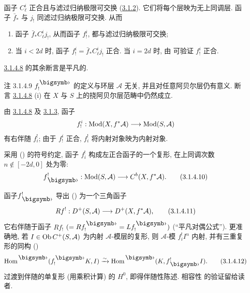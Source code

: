 函子 $C^{i}_{\ell}$ 正合且与滤过归纳极限可交换 (\hyperref[XVIII.subsubsec3.1.2]{3.1.2}). 它们将每个层映为无上同调层. 函子 $\bar{f}_{\ast}$ 与 $j_{!}$ 同滤过归纳极限可交换. 从而
\begin{enumerate}
\renewcommand{\theenumi}{\alph{enumi}}
\renewcommand{\labelenumi}{\theenumi)}
\item 函子 $\bar{f}_{\ast}C^{i}_{\ell}j_{!}$, 从而函子 $f^{i}_{!}$, 都与滤过归纳极限可交换;

\item 当 $i<2d$ 时, 函子 $f^{i}_{!}=\bar{f}_{\ast}C^{i}_{\ell}j_{!}$ 正合. 当 $i=2d$ 时, 由  可验证 $f^{i}_{!}$ 正合.
\end{enumerate}

\hyperref[XVIII.lem3.1.4.8]{3.1.4.8} 的其余断言是平凡的.

\hypertarget{sga4.exp.XVIII.remark.3.1.4.9}{}\begin{enonce*}[remark]{注 3.1.4.9}
$f^{\bigdot}_{!}$ 的定义与环层 $\mathcal{A}$ 无关, 并且对任意阿贝尔层仍有意义. 断言 \hyperref[XVIII.lem3.1.4.8]{3.1.4.8} (i) 在 $X$ 与 $S$ 上的挠阿贝尔层范畴中仍然成立.
\end{enonce*}

由 \hyperref[XVIII.lem3.1.4.8]{3.1.4.8} 及 \hyperref[XVIII.lem3.1.3]{3.1.3}, 函子
$$
f^{i}_{!}:\operatorname{Mod}(X,f^{\ast}\mathcal{A})\longrightarrow
\operatorname{Mod}(S,\mathcal{A})
$$
有右伴随 $f^{!}_{i}$; 由于 $f^{i}_{!}$ 正合, $f^{!}_{i}$ 将内射对象映为内射对象.

采用 () 的符号约定, 函子 $f^{!}_{i}$ 构成左正合函子的一个复形, 在上同调次数 $n\not\in [-2d,0]$ 处为零:
\begin{equation*}
f^{!}_{\bigdot}:\Mod(S,\mathcal{A})\longrightarrow
C^{b}(X,f^{\ast}\mathcal{A}){\quoi}.\tag{3.1.4.10}
\end{equation*}

函子\pageoriginale $f^{!}_{\bigdot}$ 导出 () 为一个三角函子
\begin{equation*}
Rf^{!}:D^{+}(S,\mathcal{A})\longrightarrow
D^{+}(X,f^{\ast}\mathcal{A}){},\tag{3.1.4.11}
\end{equation*}%
它右伴随于函子 $Rf_{!}$ $(=Rf^{\bigdot}_{!}=Lf^{\bigdot}_{!})$ (“平凡对偶公式”). 更准确地, 若 $I\in \operatorname{Ob} C^{+}(S,\mathcal{A})$ 为内射 $\mathcal{A}$-模层的复形, 则 $\mathcal{A}$-模 $f^{!}_{i} I^{n}$ 内射, 并有三重复形的同构 ()
\begin{equation*}
\Hom^{\bigdot}(f^{\bigdot}_{!}K, I)\xrightarrow{\sim}
\Hom^{\bigdot}(K,f^{!}_{\bigdot}I){\quoi}.\tag{3.1.4.12}
\end{equation*}%
过渡到伴随的单复形 (用乘积计算) 的 $H^{0}$, 即得伴随性陈述. 相容性  的验证留给读者.

